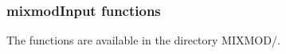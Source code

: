 




\subsubsection{{\sc mixmodInput} functions}

The functions are available in the directory MIXMOD/.

